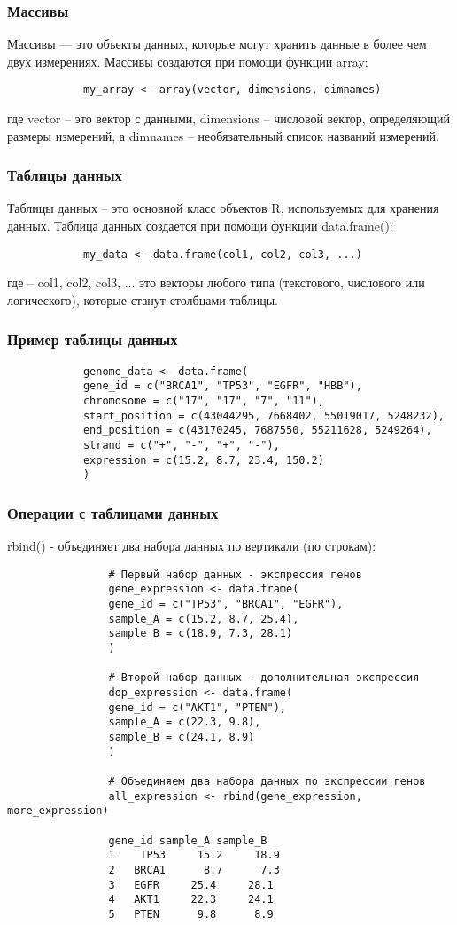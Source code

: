 \documentclass[10pt]{beamer}
\begin{document}
	\begin{frame}[fragile]
		
		
		\frametitle{Массивы}
		Массивы — это объекты данных, которые могут хранить данные в более чем двух измерениях. Массивы создаются при помощи функции array:
		
		\begin{verbatim}
			my_array <- array(vector, dimensions, dimnames)
		\end{verbatim}
		где vector – это вектор с данными, dimensions – числовой вектор, определяющий размеры измерений, а dimnames – необязательный список названий измерений.	
	\end{frame}
	
	\begin{frame}[fragile]
		\frametitle{Таблицы данных}
		Таблицы данных – это основной класс объектов R, используемых для хранения данных.  Таблица данных создается при помощи функции data.frame():
		\begin{verbatim}
			my_data <- data.frame(col1, col2, col3, ...)
		\end{verbatim}
		где – col1, col2, col3, ... это векторы любого типа (текстового, числового или логического), которые станут столбцами таблицы.	
	\end{frame}
	
	\begin{frame}[fragile]
		
		
		\frametitle{Пример таблицы данных}
		
		\begin{verbatim}
			genome_data <- data.frame(
			gene_id = c("BRCA1", "TP53", "EGFR", "HBB"),
			chromosome = c("17", "17", "7", "11"),
			start_position = c(43044295, 7668402, 55019017, 5248232),
			end_position = c(43170245, 7687550, 55211628, 5249264),
			strand = c("+", "-", "+", "-"),
			expression = c(15.2, 8.7, 23.4, 150.2)
			)
		\end{verbatim}	
	\end{frame}
	
	\begin{frame}[fragile]
		\frametitle{Операции с таблицами данных}
		rbind() - объединяет два набора данных по вертикали (по строкам):
		{\fontsize{7}{8}\selectfont	
			\begin{verbatim}
				# Первый набор данных - экспрессия генов
				gene_expression <- data.frame(
				gene_id = c("TP53", "BRCA1", "EGFR"),
				sample_A = c(15.2, 8.7, 25.4),
				sample_B = c(18.9, 7.3, 28.1)
				)
				
				# Второй набор данных - дополнительная экспрессия
				dop_expression <- data.frame(
				gene_id = c("AKT1", "PTEN"),
				sample_A = c(22.3, 9.8),
				sample_B = c(24.1, 8.9)
				)
				
				# Объединяем два набора данных по экспрессии генов
				all_expression <- rbind(gene_expression, more_expression)
				
				gene_id sample_A sample_B
				1    TP53     15.2     18.9
				2   BRCA1      8.7      7.3
				3   EGFR     25.4     28.1
				4   AKT1     22.3     24.1
				5   PTEN      9.8      8.9		
			\end{verbatim}
		}	
		
	\end{frame}
	
\end{document}
